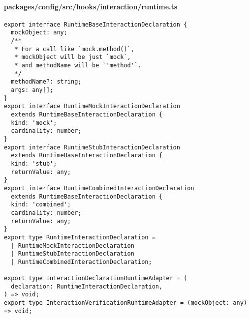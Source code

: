 \paragraph*{packages/config/src/hooks/interaction/runtime.ts}
\begin{verbatim}
export interface RuntimeBaseInteractionDeclaration {
  mockObject: any;
  /**
   * For a call like `mock.method()`,
   * mockObject will be just `mock`,
   * and methodName will be `'method'`.
   */
  methodName?: string;
  args: any[];
}
export interface RuntimeMockInteractionDeclaration
  extends RuntimeBaseInteractionDeclaration {
  kind: 'mock';
  cardinality: number;
}
export interface RuntimeStubInteractionDeclaration
  extends RuntimeBaseInteractionDeclaration {
  kind: 'stub';
  returnValue: any;
}
export interface RuntimeCombinedInteractionDeclaration
  extends RuntimeBaseInteractionDeclaration {
  kind: 'combined';
  cardinality: number;
  returnValue: any;
}
export type RuntimeInteractionDeclaration =
  | RuntimeMockInteractionDeclaration
  | RuntimeStubInteractionDeclaration
  | RuntimeCombinedInteractionDeclaration;

export type InteractionDeclarationRuntimeAdapter = (
  declaration: RuntimeInteractionDeclaration,
) => void;
export type InteractionVerificationRuntimeAdapter = (mockObject: any) => void;
\end{verbatim}

